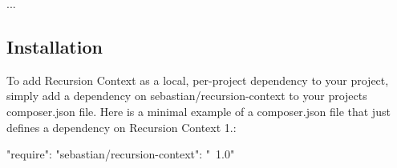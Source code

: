 ...

\subsection*{Installation}

To add Recursion Context as a local, per-\/project dependency to your project, simply add a dependency on {\ttfamily sebastian/recursion-\/context} to your project\textquotesingle{}s {\ttfamily composer.\+json} file. Here is a minimal example of a {\ttfamily composer.\+json} file that just defines a dependency on Recursion Context 1.\+: \begin{DoxyVerb}{
    "require": {
        "sebastian/recursion-context": "~1.0"
    }
}\end{DoxyVerb}
 